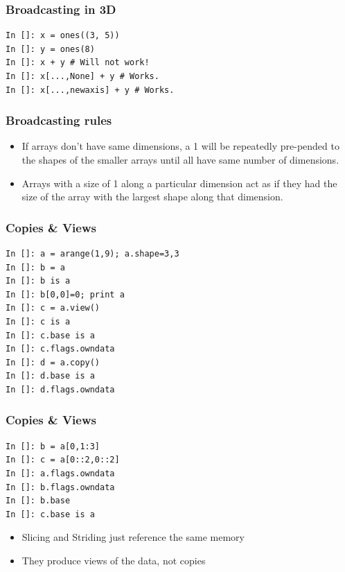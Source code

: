 \documentclass[14pt,compress]{beamer}
\begin{document}
\begin{frame}[fragile]
  \frametitle{Broadcasting in 3D}
    \begin{lstlisting}
In []: x = ones((3, 5))
In []: y = ones(8)
In []: x + y # Will not work!
In []: x[...,None] + y # Works.
In []: x[...,newaxis] + y # Works.
    \end{lstlisting}
\end{frame}

\begin{frame}[fragile]
  \frametitle{Broadcasting rules}
  \begin{itemize}

      \item If arrays don't have same dimensions, a 1 will be
          repeatedly pre-pended to the shapes of the smaller arrays
          until all have same number of dimensions.

      \item Arrays with a size of 1 along a particular dimension act as
          if they had the size of the array with the largest shape along
          that dimension.

  \end{itemize}
\end{frame}

\begin{frame}[fragile]
  \frametitle{Copies \& Views}
  \vspace{-0.1in}
  \begin{lstlisting}
In []: a = arange(1,9); a.shape=3,3
In []: b = a
In []: b is a
In []: b[0,0]=0; print a
In []: c = a.view()
In []: c is a
In []: c.base is a
In []: c.flags.owndata
In []: d = a.copy()
In []: d.base is a
In []: d.flags.owndata
  \end{lstlisting}
\end{frame}

\begin{frame}[fragile]
  \frametitle{Copies \& Views}
  \vspace{-0.1in}
  \begin{lstlisting}
In []: b = a[0,1:3]
In []: c = a[0::2,0::2]
In []: a.flags.owndata
In []: b.flags.owndata
In []: b.base
In []: c.base is a
  \end{lstlisting}
  \begin{itemize}
  \item Slicing and Striding just reference the same memory
  \item They produce views of the data, not copies
  \end{itemize}
\end{frame}
\end{document}
